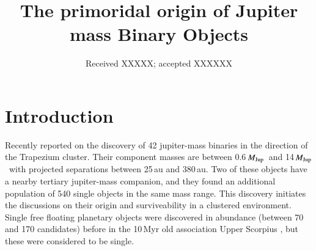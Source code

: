 \documentclass[aa]{lib/aa}
\newcommand{\MJup}{\mbox{${M}_{\rm Jup}$}}
\begin{document}
 

   \title{The primoridal origin of Jupiter mass Binary Objects}
   \date{Received XXXXX; accepted XXXXXX}

  \abstract
   {}
   {}
   {}
   {}
   {}

   \maketitle
   
\section{Introduction}

Recently \cite{2023arXiv231001231P} reported on the discovery of 42
jupiter-mass binaries in the direction of the Trapezium cluster.
Their component masses are between 0.6\,\MJup\, and 14\,\MJup\, with
projected separations between 25\,au and 380\,au.  Two of these
objects have a nearby tertiary jupiter-mass companion, and they found
an additional population of 540 single objects in the same mass
range. This discovery initiates the discussions on their origin and
surviveability in a clustered environment.  Single free floating
planetary objects were discovered in abundance (between 70 and 170
candidates) before in the 10\,Myr old association Upper Scorpius
\cite{2022NatAs...6...89M}, but these were considered to be single.
\end{document}
